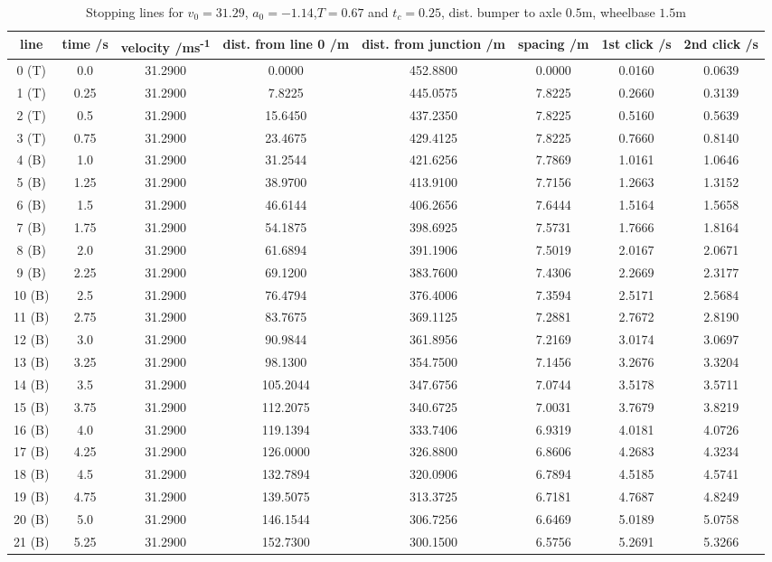 \newpage\begin{landscape}\small{\begin{longtable}{c|c|c|c|c|c|c|c}
\caption{Stopping lines for $v_0=31.29$, $a_0=-1.14$,$T=0.67$ and $t_c=0.25$, dist. bumper to axle $0.5$m, wheelbase $1.5$m}\\
line&time /s&velocity /ms\textsuperscript{-1}&dist. from line 0 /m&dist. from junction /m&spacing /m&1st click /s&2nd click /s\\\hline
0 (T)&0.0&31.2900&0.0000&452.8800&0.0000&0.0160&0.0639 \\
1 (T)&0.25&31.2900&7.8225&445.0575&7.8225&0.2660&0.3139 \\
2 (T)&0.5&31.2900&15.6450&437.2350&7.8225&0.5160&0.5639 \\
3 (T)&0.75&31.2900&23.4675&429.4125&7.8225&0.7660&0.8140 \\
4 (B)&1.0&31.2900&31.2544&421.6256&7.7869&1.0161&1.0646 \\
5 (B)&1.25&31.2900&38.9700&413.9100&7.7156&1.2663&1.3152 \\
6 (B)&1.5&31.2900&46.6144&406.2656&7.6444&1.5164&1.5658 \\
7 (B)&1.75&31.2900&54.1875&398.6925&7.5731&1.7666&1.8164 \\
8 (B)&2.0&31.2900&61.6894&391.1906&7.5019&2.0167&2.0671 \\
9 (B)&2.25&31.2900&69.1200&383.7600&7.4306&2.2669&2.3177 \\
10 (B)&2.5&31.2900&76.4794&376.4006&7.3594&2.5171&2.5684 \\
11 (B)&2.75&31.2900&83.7675&369.1125&7.2881&2.7672&2.8190 \\
12 (B)&3.0&31.2900&90.9844&361.8956&7.2169&3.0174&3.0697 \\
13 (B)&3.25&31.2900&98.1300&354.7500&7.1456&3.2676&3.3204 \\
14 (B)&3.5&31.2900&105.2044&347.6756&7.0744&3.5178&3.5711 \\
15 (B)&3.75&31.2900&112.2075&340.6725&7.0031&3.7679&3.8219 \\
16 (B)&4.0&31.2900&119.1394&333.7406&6.9319&4.0181&4.0726 \\
17 (B)&4.25&31.2900&126.0000&326.8800&6.8606&4.2683&4.3234 \\
18 (B)&4.5&31.2900&132.7894&320.0906&6.7894&4.5185&4.5741 \\
19 (B)&4.75&31.2900&139.5075&313.3725&6.7181&4.7687&4.8249 \\
20 (B)&5.0&31.2900&146.1544&306.7256&6.6469&5.0189&5.0758 \\
21 (B)&5.25&31.2900&152.7300&300.1500&6.5756&5.2691&5.3266 \\

\end{longtable}}
\end{landscape}
